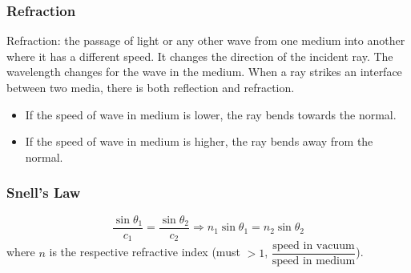 \begin{center}
\end{center}
\subsubsection*{Refraction}
Refraction: the passage of light or any other wave from one medium into another where it has a different speed.
It changes the direction of the incident ray. The wavelength changes for the wave in the medium.
When a ray strikes an interface between two media, there is both reflection and refraction. 
\begin{itemize}
  \item If the speed of wave in medium is lower, the ray bends towards the normal.
  \item If the speed of wave in medium is higher, the ray bends away from the normal.
\end{itemize}
\subsubsection*{Snell's Law}
\[\dfrac{\sin\theta_1}{c_1}=\dfrac{\sin\theta_2}{c_2}\Rightarrow n_1\sin\theta_1=n_2\sin\theta_2\]
where $n$ is the respective refractive index (must $>1$, $\dfrac{\text{speed in vacuum}}{\text{speed in medium}}$).
